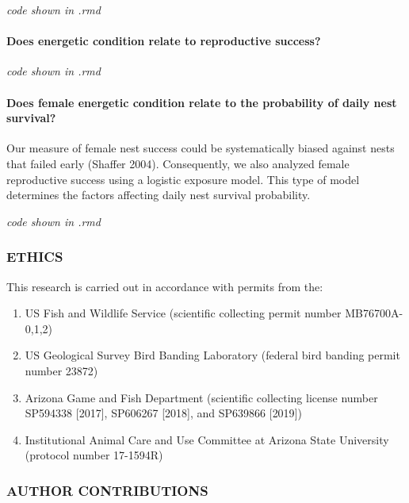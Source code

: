 \documentclass[
]{article}
\providecommand{\tightlist}{%
  \setlength{\itemsep}{0pt}\setlength{\parskip}{0pt}}
\begin{document}
\emph{code shown in .rmd}

\hypertarget{does-energetic-condition-relate-to-reproductive-success}{%
\paragraph{Does energetic condition relate to reproductive
success?}\label{does-energetic-condition-relate-to-reproductive-success}}

\emph{code shown in .rmd}

\hypertarget{does-female-energetic-condition-relate-to-the-probability-of-daily-nest-survival}{%
\paragraph{Does female energetic condition relate to the probability of
daily nest
survival?}\label{does-female-energetic-condition-relate-to-the-probability-of-daily-nest-survival}}

Our measure of female nest success could be systematically biased
against nests that failed early (Shaffer 2004). Consequently, we also
analyzed female reproductive success using a logistic exposure model.
This type of model determines the factors affecting daily nest survival
probability.

\emph{code shown in .rmd}

\hypertarget{ethics}{%
\subsubsection{ETHICS}\label{ethics}}

This research is carried out in accordance with permits from the:

\begin{enumerate}
\def\labelenumi{\arabic{enumi})}
\tightlist
\item
  US Fish and Wildlife Service (scientific collecting permit number
  MB76700A-0,1,2)
\item
  US Geological Survey Bird Banding Laboratory (federal bird banding
  permit number 23872)
\item
  Arizona Game and Fish Department (scientific collecting license number
  SP594338 {[}2017{]}, SP606267 {[}2018{]}, and SP639866 {[}2019{]})
\item
  Institutional Animal Care and Use Committee at Arizona State
  University (protocol number 17-1594R)
\end{enumerate}

\hypertarget{author-contributions}{%
\subsubsection{AUTHOR CONTRIBUTIONS}\label{author-contributions}}
\end{document}
